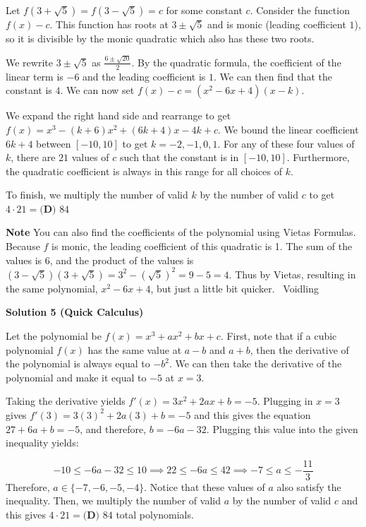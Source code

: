 \begin{enumerate}
Let $f\left( 3+\sqrt{5}\right) = f\left( 3-\sqrt{5}\right) = c$ for some constant $c$. Consider the function $f(x)-c$. This function has roots at $3 \pm \sqrt{5}$ and is monic (leading coefficient $1$), so it is divisible by the monic quadratic which also has these two roots.

 
We rewrite $3 \pm \sqrt{5}$ as $\frac{6\pm \sqrt{20}}{2}$. By the quadratic formula, the coefficient of the linear term is $-6$ and the leading coefficient is $1$. We can then find that the constant is $4$. We can now set $f(x)-c=(x^2-6x+4)(x-k)$.

 
We expand the right hand side and rearrange to get $f(x)=x^3-(k+6)x^2+(6k+4)x-4k+c$. We bound the linear coefficient $6k+4$ between $[-10, 10]$ to get $k=-2, -1, 0, 1$. For any of these four values of $k$, there are $21$ values of $c$ such that the constant is in $[-10, 10]$. Furthermore, the quadratic coefficient is always in this range for all choices of $k$. 

 
To finish, we multiply the number of valid $k$ by the number of valid $c$ to get $4 \cdot 21= \boxed{\textbf{(D) } 84}$

 \textbf{Note} You can also find the coefficients of the polynomial using Vietas Formulas. Because $f$ is monic, the leading coefficient of this quadratic is 1. The sum of the values is $6$, and the product of the values is $(3-\sqrt{5})(3+\sqrt{5})=3^2-(\sqrt{5})^2=9-5=4$. Thus by Vietas, resulting in the same polynomial, $x^2-6x+4$, but just a little bit quicker. ~Voidling

 



\textbf{Solution 5 (Quick Calculus)}

Let the polynomial be $f(x)=x^3+ax^2+bx+c$. First, note that if a cubic polynomial $f(x)$ has the same value at $a-b$ and $a+b$, then the derivative of the polynomial is always equal to $-b^2$. We can then take the derivative of the polynomial and make it equal to $-5$ at $x=3$.

 
Taking the derivative yields $f'(x)=3x^2+2ax+b=-5$. Plugging in $x=3$ gives $f'(3)=3(3)^2+2a(3)+b=-5$ and this gives the equation $27+6a+b=-5$, and therefore, $b=-6a-32$. Plugging this value into the given inequality yields:

 
 \[-10\le -6a-32\le 10\implies 22\le -6a\le 42\implies -7\le a\le -\frac{11}{3}\]Therefore, $a\in\{-7, -6, -5, -4\}$. Notice that these values of $a$ also satisfy the inequality. Then, we multiply the number of valid $a$ by the number of valid $c$ and this gives $4 \cdot 21= \boxed{\textbf{(D) } 84}$ total polynomials.


\end{enumerate}

